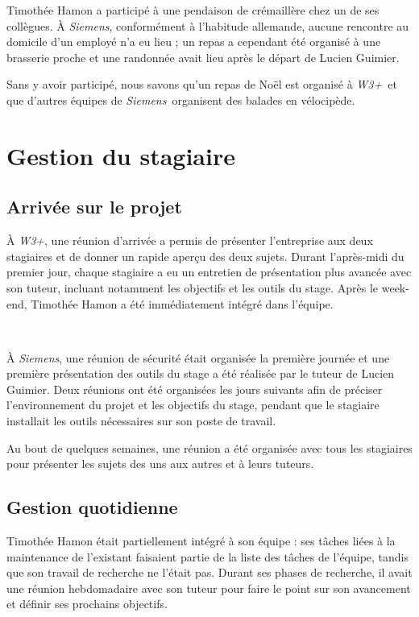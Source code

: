 \documentclass[a4paper, oneside, 12pt]{article}
\def\www{\emph{W3+}}
\def\siemens{\emph{Siemens}}
\begin{document}
Timothée {\sc Hamon} a participé à une pendaison de crémaillère chez un de ses collègues. À \siemens, conformément à l’habitude allemande, aucune rencontre au domicile d’un employé n’a eu lieu ; un repas a cependant été organisé à une brasserie proche et une randonnée avait lieu après le départ de Lucien {\sc Guimier}.

Sans y avoir participé, nous savons qu’un repas de Noël est organisé à \www\ et que d’autres équipes de \siemens\ organisent des balades en vélocipède.

\vfill

\section{Gestion du stagiaire}

\subsection{Arrivée sur le projet}

À \www, une réunion d’arrivée a permis de présenter l’entreprise aux deux stagiaires et de donner un rapide aperçu des deux sujets. Durant l’après-midi du premier jour, chaque stagiaire a eu un entretien de présentation plus avancée avec son tuteur, incluant notamment les objectifs et les outils du stage. Après le week-end, Timothée {\sc Hamon} a été immédiatement intégré dans l’équipe.

\ 

À \siemens, une réunion de sécurité était organisée la première journée et une première présentation des outils du stage a été réalisée par le tuteur de Lucien {\sc Guimier}. Deux réunions ont été organisées les jours suivants afin de préciser l’environnement du projet et les objectifs du stage, pendant que le stagiaire installait les outils nécessaires sur son poste de travail.

Au bout de quelques semaines, une réunion a été organisée avec tous les stagiaires pour présenter les sujets des uns aux autres et à leurs tuteurs.

\vfill

\newpage

\subsection{Gestion quotidienne}

Timothée {\sc Hamon} était partiellement intégré à son équipe : ses tâches liées à la maintenance de l’existant faisaient partie de la liste des tâches de l’équipe, tandis que son travail de recherche ne l’était pas. Durant ses phases de recherche, il avait une réunion hebdomadaire avec son tuteur pour faire le point sur son avancement et définir ses prochains objectifs.
\end{document}
